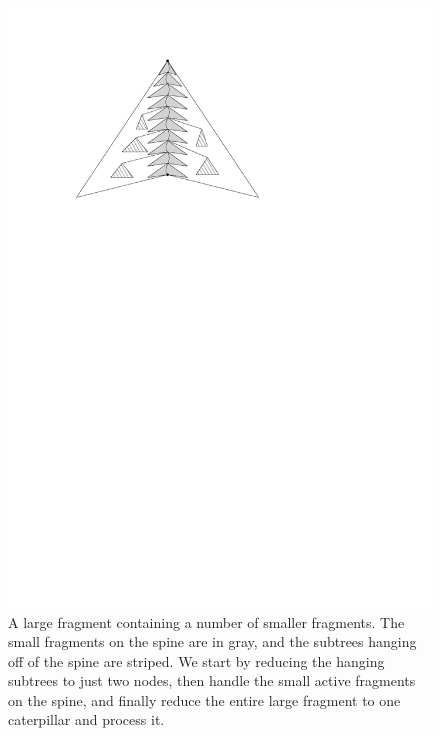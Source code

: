 \documentclass[11pt,a4paper]{article}
\theoremstyle{definition}
\theoremstyle{remark}
\begin{document}
\begin{figure}
\begin{center}
\includegraphics[scale=1]{refinement}
\end{center}
\caption{A large fragment containing a number of smaller fragments. The small fragments on the spine are in gray, and the subtrees hanging off of the spine are striped. We start by reducing the hanging subtrees to just two nodes, then handle the small active fragments on the spine, and finally reduce the entire large fragment to one caterpillar and process it.}
\end{figure}
\end{document}
